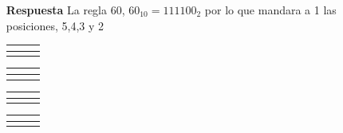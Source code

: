 \documentclass{article}
\begin{document}
\begin{enumerate}
\begin{tabular}{c|c|c} %
  \hline
 \multicolumn{1}{|c|}{ }&\cellcolor{gray} & \multicolumn{1}{c|}{\cellcolor{gray}}  \\
  \hline
 &  & \\
\cline{2-2}
\end{tabular}
\quad
\begin{tabular}{c|c|c}  %
  \hline
 \multicolumn{1}{|c|}{ }&\cellcolor{gray} & \multicolumn{1}{c|}{ }  \\
  \hline
 & \cellcolor{gray} & \\
\cline{2-2}
\end{tabular}
\quad
\begin{tabular}{c|c|c} %
  \hline
 \multicolumn{1}{|c|}{ }&  & \multicolumn{1}{c|}{\cellcolor{gray}}  \\
  \hline
 &  \cellcolor{gray} & \\
\cline{2-2}
\end{tabular}
\quad
\begin{tabular}{c|c|c}  %
  \hline
 \multicolumn{1}{|c|}{ }&  & \multicolumn{1}{c|}{ }  \\
  \hline
 & \cellcolor{gray} & \\
\cline{2-2}
\end{tabular}


\item[\bf{Respuesta}] La regla 60, $60_{10}=111100_2$ por lo que mandara a 1 las posiciones, 5,4,3 y 2

\begin{tabular}{c|c|c} %
  \hline
 \multicolumn{1}{|c|}{\cellcolor{gray}}&\cellcolor{gray}&\multicolumn{1}{c|}{\cellcolor{gray}}\\
  \hline
 &  & \\
\cline{2-2}
\end{tabular}
\quad 
\begin{tabular}{c|c|c} %
  \hline
 \multicolumn{1}{|c|}{\cellcolor{gray}}&\cellcolor{gray}& \multicolumn{1}{c|}{}\\
  \hline
 &  & \\
\cline{2-2}
\end{tabular}
\quad 
\begin{tabular}{c|c|c}%
  \hline
 \multicolumn{1}{|c|}{\cellcolor{gray}}& & \multicolumn{1}{c|}{\cellcolor{gray}}\\
  \hline
 & \cellcolor{gray}  & \\
\cline{2-2}
\end{tabular}
\quad
\begin{tabular}{c|c|c} %
  \hline
 \multicolumn{1}{|c|}{\cellcolor{gray}}& & \multicolumn{1}{c|}{ }  \\
  \hline
 & \cellcolor{gray} & \\
\cline{2-2}
\end{tabular}\\


\end{enumerate}
\end{document}

